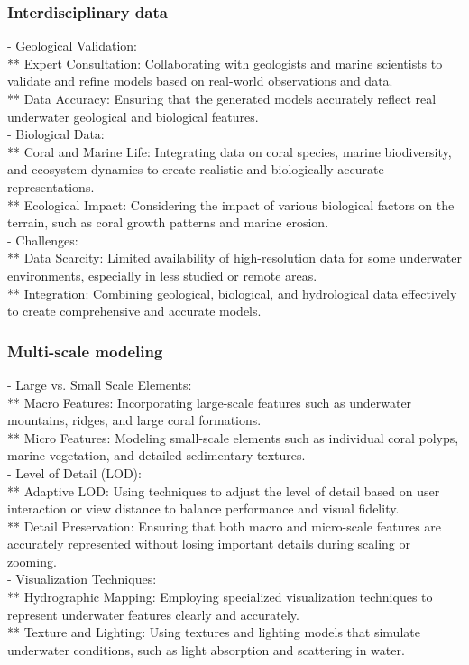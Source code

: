\subsubsection{Interdisciplinary data}
- Geological Validation: \\
** Expert Consultation: Collaborating with geologists and marine scientists to validate and refine models based on real-world observations and data. \\
** Data Accuracy: Ensuring that the generated models accurately reflect real underwater geological and biological features. \\
- Biological Data: \\
** Coral and Marine Life: Integrating data on coral species, marine biodiversity, and ecosystem dynamics to create realistic and biologically accurate representations. \\
** Ecological Impact: Considering the impact of various biological factors on the terrain, such as coral growth patterns and marine erosion. \\
- Challenges: \\
** Data Scarcity: Limited availability of high-resolution data for some underwater environments, especially in less studied or remote areas. \\
** Integration: Combining geological, biological, and hydrological data effectively to create comprehensive and accurate models. 

\subsubsection{Multi-scale modeling}
- Large vs. Small Scale Elements: \\
** Macro Features: Incorporating large-scale features such as underwater mountains, ridges, and large coral formations. \\
** Micro Features: Modeling small-scale elements such as individual coral polyps, marine vegetation, and detailed sedimentary textures. \\
- Level of Detail (LOD): \\
** Adaptive LOD: Using techniques to adjust the level of detail based on user interaction or view distance to balance performance and visual fidelity. \\
** Detail Preservation: Ensuring that both macro and micro-scale features are accurately represented without losing important details during scaling or zooming. \\
- Visualization Techniques: \\
** Hydrographic Mapping: Employing specialized visualization techniques to represent underwater features clearly and accurately. \\
** Texture and Lighting: Using textures and lighting models that simulate underwater conditions, such as light absorption and scattering in water.

